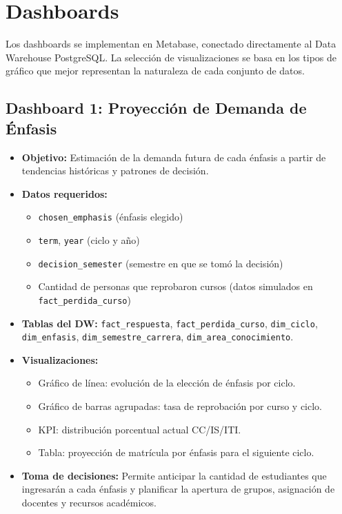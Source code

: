 \documentclass[12pt, letterpaper]{article}
\begin{document}
\section{Dashboards}

Los dashboards se implementan en Metabase, conectado directamente al Data Warehouse PostgreSQL. La selección de visualizaciones se basa en los tipos de gráfico que mejor representan la naturaleza de cada conjunto de datos.

\subsection{Dashboard 1: Proyección de Demanda de Énfasis}

\begin{itemize}
  \item \textbf{Objetivo:} Estimación de la demanda futura de cada énfasis a partir de tendencias históricas y patrones de decisión.
  \item \textbf{Datos requeridos:}
  \begin{itemize}
    \item \texttt{chosen\_emphasis} (énfasis elegido)
    \item \texttt{term}, \texttt{year} (ciclo y año)
    \item \texttt{decision\_semester} (semestre en que se tomó la decisión)
    \item Cantidad de personas que reprobaron cursos (datos simulados en \texttt{fact\_perdida\_curso})
  \end{itemize}
  \item \textbf{Tablas del DW:} \texttt{fact\_respuesta}, \texttt{fact\_perdida\_curso}, \texttt{dim\_ciclo}, \texttt{dim\_enfasis}, \texttt{dim\_semestre\_carrera}, \texttt{dim\_area\_conocimiento}.
  \item \textbf{Visualizaciones:}
  \begin{itemize}
    \item Gráfico de línea: evolución de la elección de énfasis por ciclo.
    \item Gráfico de barras agrupadas: tasa de reprobación por curso y ciclo.
    \item KPI: distribución porcentual actual CC/IS/ITI.
    \item Tabla: proyección de matrícula por énfasis para el siguiente ciclo.
  \end{itemize}
  \item \textbf{Toma de decisiones:} Permite anticipar la cantidad de estudiantes que ingresarán a cada énfasis y planificar la apertura de grupos, asignación de docentes y recursos académicos.
\end{itemize}
\end{document}
